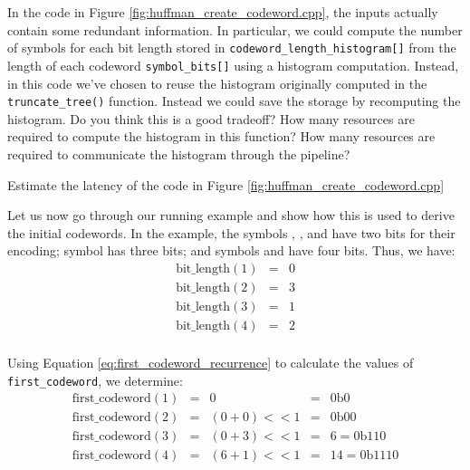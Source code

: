 \begin{exercise}
In the code in Figure \ref{fig:huffman_create_codeword.cpp}, the inputs actually contain some redundant information.  In particular, we could compute the number of symbols for each bit length stored in \lstinline{codeword_length_histogram[]} from the length of each codeword \lstinline{symbol_bits[]} using a histogram computation.  Instead, in this code we've chosen to reuse the histogram originally computed in the \lstinline{truncate_tree()} function.  Instead we could save the storage by recomputing the histogram.  Do you think this is a good tradeoff?   How many resources are required to compute the histogram in this function?  How many resources are required to communicate the histogram through the pipeline?
\end{exercise}

\begin{exercise}
Estimate the latency of the code in Figure
\ref{fig:huffman_create_codeword.cpp}
\end{exercise}

Let us now go through our running example and show how this is used to derive the initial codewords. In the example, the symbols , , and  have two bits for their encoding; symbol  has three bits; and symbols  and  have four bits. Thus, we have:
\begin{equation}
\begin{array} {lcl} 
\mathrm{bit\_length}(1) & = & 0 \\
\mathrm{bit\_length}(2) & = & 3 \\
\mathrm{bit\_length}(3) & = & 1 \\
\mathrm{bit\_length}(4) & = & 2 \\
\end{array}
\label{eq:bit_lengths}
\end{equation}

Using Equation \ref{eq:first_codeword_recurrence} to calculate the values of \lstinline{first_codeword}, we determine:
\begin{equation}
\begin{array} {lllll} 
\mathrm{first\_codeword}(1) & = & 0 & = & \mathrm{0b0}\\
\mathrm{first\_codeword}(2) & = & (0 + 0) << 1 &=& \mathrm{0b00} \\
\mathrm{first\_codeword}(3) & = & (0 + 3) << 1 &=& 6 = \mathrm{0b110} \\
\mathrm{first\_codeword}(4) & = & (6 + 1) << 1 &=& 14 = \mathrm{0b1110} \\
\end{array}
\label{eq:symbols}
\end{equation}

